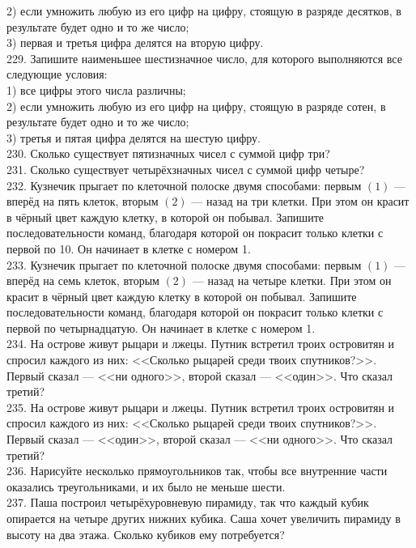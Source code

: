 2) если умножить любую из его цифр на цифру, стоящую в разряде десятков, в результате будет одно и то же число;\\
3) первая и третья цифра делятся на вторую цифру.\\
229. Запишите наименьшее шестизначное число, для которого выполняются все следующие условия:\\
1) все цифры этого числа различны;\\
2) если умножить любую из его цифр на цифру, стоящую в разряде сотен, в результате будет одно и то же число;\\
3) третья и пятая цифра делятся на шестую цифру.\\
230. Сколько существует пятизначных чисел с суммой цифр три?\\
231. Сколько существует четырёхзначных чисел с суммой цифр четыре?\\
232. Кузнечик прыгает по клеточной полоске двумя способами: первым $(1)$ --- вперёд на пять клеток, вторым $(2)$ --- назад на три клетки. При этом он красит в чёрный цвет каждую клетку,  в которой он побывал. Запишите последовательности команд, благодаря которой он покрасит только клетки с первой по 10. Он начинает в клетке с номером 1.\\
233. Кузнечик прыгает по клеточной полоске двумя способами: первым $(1)$ --- вперёд на семь клеток, вторым $(2)$ --- назад на четыре клетки. При этом он красит в чёрный цвет каждую клетку в которой он побывал. Запишите последовательности команд, благодаря которой он покрасит только клетки с первой по четырнадцатую. Он начинает в клетке с номером 1.\\
234. На острове живут рыцари и лжецы. Путник встретил троих островитян и спросил каждого из них: <<Сколько рыцарей среди твоих спутников?>>. Первый сказал --- <<ни одного>>,  второй сказал --- <<один>>. Что сказал третий?\\
235. На острове живут рыцари и лжецы. Путник встретил троих островитян и спросил каждого из них: <<Сколько рыцарей среди твоих спутников?>>. Первый сказал --- <<один>>,  второй сказал --- <<ни одного>>. Что сказал третий?\\
236. Нарисуйте несколько прямоугольников так, чтобы все внутренние части оказались треугольниками, и их было не меньше шести.\\
237. Паша построил четырёхуровневую пирамиду, так что каждый кубик опирается на четыре других нижних кубика. Саша хочет увеличить пирамиду в высоту на два этажа. Сколько кубиков ему потребуется?\\
